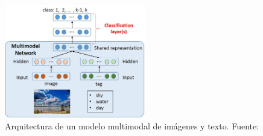 \begin{itemize}
	\begin{figure}[!ht]
		\begin{center}
			\includegraphics[width=0.55\textwidth]{2/figures/multimodal_network.jpg}
			\caption{Arquitectura de un modelo multimodal de imágenes y texto. Fuente: \cite{tec_nishida2015multimodal}}
			\label{2:fig47}
		\end{center}
	\end{figure}
	
\end{itemize}